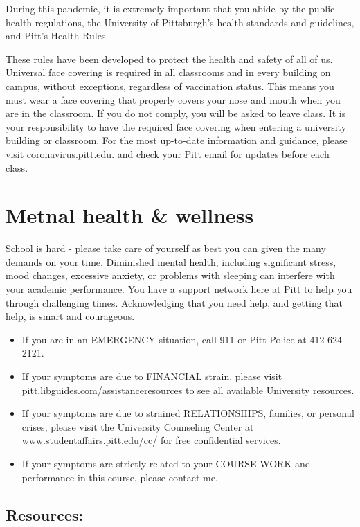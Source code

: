 \documentclass[
]{book}
\providecommand{\tightlist}{%
  \setlength{\itemsep}{0pt}\setlength{\parskip}{0pt}}
\begin{document}
During this pandemic, it is extremely important that you abide by the public health regulations, the University of Pittsburgh's health standards and guidelines, and Pitt's Health Rules.

These rules have been developed to protect the health and safety of all of us. Universal face covering is required in all classrooms and in every building on campus, without exceptions, regardless of vaccination status. This means you must wear a face covering that properly covers your nose and mouth when you are in the classroom. If you do not comply, you will be asked to leave class. It is your responsibility to have the required face covering when entering a university building or classroom. For the most up-to-date information and guidance, please visit \url{coronavirus.pitt.edu}. and check your Pitt email for updates before each class.

\hypertarget{metnal-health-wellness}{%
\chapter{Metnal health \& wellness}\label{metnal-health-wellness}}

School is hard - please take care of yourself as best you can given the many demands on your time. Diminished mental health, including significant stress, mood changes, excessive anxiety, or problems with sleeping can interfere with your academic performance. You have a support network here at Pitt to help you through challenging times. Acknowledging that you need help, and getting that help, is smart and courageous.

\begin{itemize}
\tightlist
\item
  If you are in an EMERGENCY situation, call 911 or Pitt Police at 412-624-2121.
\item
  If your symptoms are due to FINANCIAL strain, please visit pitt.libguides.com/assistanceresources to see all available University resources.
\item
  If your symptoms are due to strained RELATIONSHIPS, families, or personal crises, please visit the University Counseling Center at www.studentaffairs.pitt.edu/cc/ for free confidential services.
\item
  If your symptoms are strictly related to your COURSE WORK and performance in this course, please contact me.
\end{itemize}

\hypertarget{resources}{%
\section{Resources:}\label{resources}}
\end{document}
